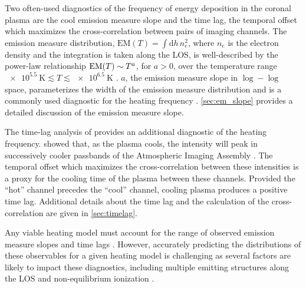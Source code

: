 Two often-used diagnostics of the frequency of energy deposition in the coronal plasma are the cool emission measure slope and the time lag, the temporal offset which maximizes the cross-correlation between pairs of imaging channels. The emission measure distribution, $\mathrm{EM}(T)=\int\mathrm{d}h\,n_e^2$, where $n_e$ is the electron density and the integration is taken along the LOS, is well-described by the power-law relationship $\textup{EM}(T)\sim T^a$, for $a>0$, over the temperature range $\SI{e5.5}{\kelvin}\lesssim T\lesssim\SI{e6.5}{\kelvin}$ \citep{jordan_structure_1975,jordan_structure_1976}. $a$, the emission measure slope in $\log-\log$ space, parameterizes the width of the emission measure distribution and is a commonly used diagnostic for the heating frequency \citep[e.g.][]{tripathi_emission_2011,winebarger_using_2011,warren_constraints_2011,mulu-moore_can_2011,bradshaw_diagnosing_2012,schmelz_cold_2012,reep_diagnosing_2013,del_zanna_evolution_2015}. \autoref{sec:em_slope} provides a detailed discussion of the emission measure slope.

The time-lag analysis of \citet{viall_evidence_2012} provides an additional diagnostic of the heating frequency. \citet{viall_patterns_2011} showed that, as the plasma cools, the intensity will peak in successively cooler passbands of the Atmospheric Imaging Assembly \citep[AIA,][]{lemen_atmospheric_2012}. The temporal offset which maximizes the cross-correlation between these intensities is a proxy for the cooling time of the plasma between these channels. Provided the ``hot'' channel precedes the ``cool'' channel, cooling plasma produces a positive time lag. Additional details about the time lag and the calculation of the cross-correlation are given in \autoref{sec:timelag}. 

Any viable heating model must account for the range of observed emission measure slopes and time lags \citep{viall_survey_2017}. However, accurately predicting the distributions of these observables for a given heating model is challenging as several factors are likely to impact these diagnostics, including multiple emitting structures along the LOS and non-equilibrium ionization \citep[e.g.][]{barnes_inference_2016}.


